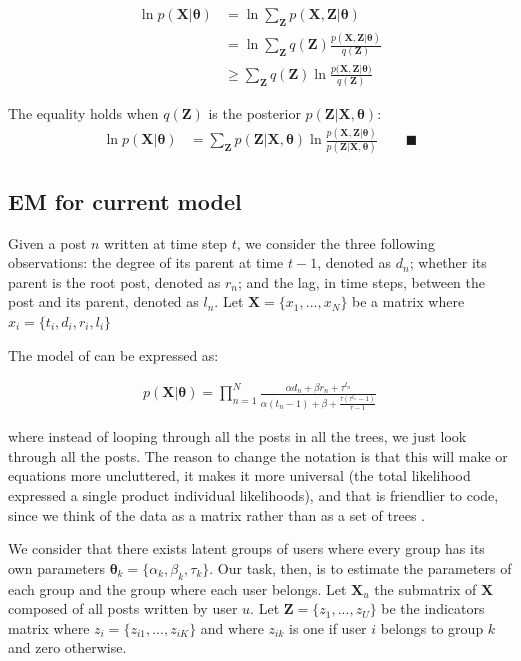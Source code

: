 \documentclass[smallextended]{svjour3}          %
\begin{document}
\begin{align}
\ln p(\mathbf{X} | \boldsymbol{\theta}) &=  \ln \sum_{\mathbf{Z}}  p(\mathbf{X}, \mathbf{Z}  | \boldsymbol{\theta}) \\
&=\ln \sum_{\mathbf{Z}} q(\mathbf{Z}) \frac{p(\mathbf{X}, \mathbf{Z}  | \boldsymbol{\theta})}{ q(\mathbf{Z})}\\
&\geq \sum_{\mathbf{Z}} q(\mathbf{Z}) \ln \frac{p(\mathbf{X}, \mathbf{Z} | \boldsymbol{\theta)}}{q(\mathbf{Z})}
\end{align}


The equality holds when $q(\mathbf{Z})$ is the posterior $p(\mathbf{Z} | \mathbf{X}, \boldsymbol{\theta})$:
\begin{align}
\ln p(\mathbf{X} | \boldsymbol{\theta}) &=  \sum_{\mathbf{Z}} p(\mathbf{Z} | \mathbf{X}, \boldsymbol{\theta}) \ln \frac{p(\mathbf{X, Z} | \boldsymbol{\theta})}{ p(\mathbf{Z} | \mathbf{X}, \boldsymbol{\theta})} \qquad \blacksquare
\label{eq:em_general}
\end{align}


\subsection{EM for current model} 

Given a post $n$ written at time step $t$, we consider the three following observations: the degree of its parent at time $t-1$, denoted as $d_n$; whether its parent is the root post, denoted as $r_n$; and the lag, in time steps, between the post and its parent, denoted as $l_n$. Let $\mathbf{X} = \{x_1,...,x_N\}$ be a matrix where $x_i = \{t_i, d_i, r_i, l_i\}$

The model of \cite{Gomez2012a} can be expressed as:

\begin{align}
p(\mathbf{X} | \boldsymbol{\theta}) = \prod_{n=1}^N
\frac{\alpha d_n + \beta r_n + \tau^{l_n}}{\alpha(t_n-1)+\beta + \frac{\tau(\tau^{t_n}-1)}{\tau-1}}
\end{align} 

where instead of looping through all the posts in all the trees, we just look through all the posts. The reason to change the notation is that this will make or equations more uncluttered, it makes it more universal (the total likelihood expressed a single product individual likelihoods), and that is friendlier to code, since we think of the data as a matrix rather than as a set of trees .  

We consider that there exists latent groups of users where every group has its own parameters $\mathbf{\theta}_k = \{\alpha_k, \beta_k, \tau_k\}$. Our task, then, is to estimate the parameters of each group and the group where each user belongs. Let $\mathbf{X}_u$ the submatrix of $\mathbf{X}$ composed of all posts written by user $u$. Let $\mathbf{Z} = \{z_1,...,z_U\}$ be the indicators matrix where $z_i=\{z_{i1},...,z_{iK}\}$ and where $z_{ik}$ is one if user $i$ belongs to group $k$ and zero otherwise.    
\end{document}
